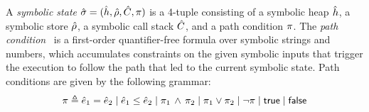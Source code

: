 
%
A \emph{symbolic state} $\hat{\sigma} = (\hat{h}, \hat\rho, \hat{C}, \pi)$ is a 4-tuple consisting of a 
symbolic heap $\hat{h}$, a symbolic store $\hat\rho$, a symbolic call stack $\hat{C}$, and a path condition $\pi$. 
The \emph{path condition}~\cite{symb:exec:survey} is a first-order quantifier-free formula over symbolic strings and 
numbers, which accumulates constraints on the given symbolic inputs that trigger 
the execution to follow the path that led to the current symbolic state. 
Path conditions are given by the following grammar: 
\begin{equation*}
\pi \triangleq \hat{e}_1 = \hat{e}_2 \mid \hat{e}_1 \leq \hat{e}_2 \mid \pi_1 \, \wedge \, \pi_2 \mid \pi_1 \vee \pi_2 \mid \neg \pi \mid {\sf true} \mid {\sf false}
\end{equation*}


